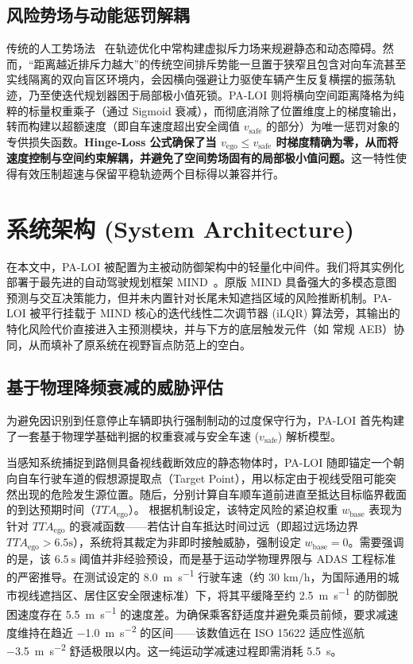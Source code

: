 \documentclass[conference]{IEEEtran}
\begin{document}
\subsection{风险势场与动能惩罚解耦}
传统的人工势场法~\cite{khatib1986potential} 在轨迹优化中常构建虚拟斥力场来规避静态和动态障碍。然而，“距离越近排斥力越大”的传统空间排斥势能一旦置于狭窄且包含对向车流甚至实线隔离的双向盲区环境内，会因横向强避让力驱使车辆产生反复横摆的振荡轨迹，乃至使迭代规划器困于局部极小值死锁。PA-LOI 则将横向空间距离降格为纯粹的标量权重乘子（通过 Sigmoid 衰减），而彻底消除了位置维度上的梯度输出，转而构建以超额速度（即自车速度超出安全阈值 $v_{\text{safe}}$ 的部分）为唯一惩罚对象的专供损失函数。\textbf{Hinge-Loss 公式确保了当 $v_{\text{ego}} \leq v_{\text{safe}}$ 时梯度精确为零，从而将速度控制与空间约束解耦，并避免了空间势场固有的局部极小值问题。}这一特性使得有效压制超速与保留平稳轨迹两个目标得以兼容并行。

\section{系统架构 (System Architecture)}

在本文中，PA-LOI 被配置为主被动防御架构中的轻量化中间件。我们将其实例化部署于最先进的自动驾驶规划框架 MIND~\cite{mind2025}。原版 MIND 具备强大的多模态意图预测与交互决策能力，但并未内置针对长尾未知遮挡区域的风险推断机制。PA-LOI 被平行挂载于 MIND 核心的迭代线性二次调节器 (iLQR) 算法旁，其输出的特化风险代价直接进入主预测模块，并与下方的底层触发元件（如 常规 AEB）协同，从而填补了原系统在视野盲点防范上的空白。

\subsection{基于物理降频衰减的威胁评估}
为避免因识别到任意停止车辆即执行强制制动的过度保守行为，PA-LOI 首先构建了一套基于物理学基础判据的权重衰减与安全车速 ($v_{\text{safe}}$) 解析模型。

当感知系统捕捉到路侧具备视线截断效应的静态物体时，PA-LOI 随即锚定一个朝向自车行驶车道的假想源提取点（Target Point），用以标定由于视线受阻可能突然出现的危险发生源位置。随后，分别计算自车顺车道前进直至抵达目标临界截面的到达预期时间（$TTA_{\text{ego}}$）。
根据机制设定，该特定风险的紧迫权重 $w_{\text{base}}$ 表现为针对 $TTA_{\text{ego}}$ 的衰减函数——若估计自车抵达时间过远（即超过远场边界 $TTA_{\text{ego}} > 6.5\text{s}$），系统将其裁定为非即时接触威胁，强制设定 $w_{\text{base}} = 0$。需要强调的是，该 $\SI{6.5}{\second}$ 阈值并非经验预设，而是基于运动学物理界限与 ADAS 工程标准的严密推导。在测试设定的 \SI{8.0}{\meter\per\second} 行驶车速（约 30 km/h，为国际通用的城市视线遮挡区、居住区安全限速标准）下，将其平缓降至约 \SI{2.5}{\meter\per\second} 的防御脱困速度存在 \SI{5.5}{\meter\per\second} 的速度差。为确保乘客舒适度并避免乘员前倾，要求减速度维持在趋近 \SI{-1.0}{\meter\per\second\squared} 的区间——该数值远在 ISO 15622 适应性巡航 \SI{-3.5}{\meter\per\second\squared} 舒适极限以内。这一纯运动学减速过程即需消耗 \SI{5.5}{\second}。
\end{document}
